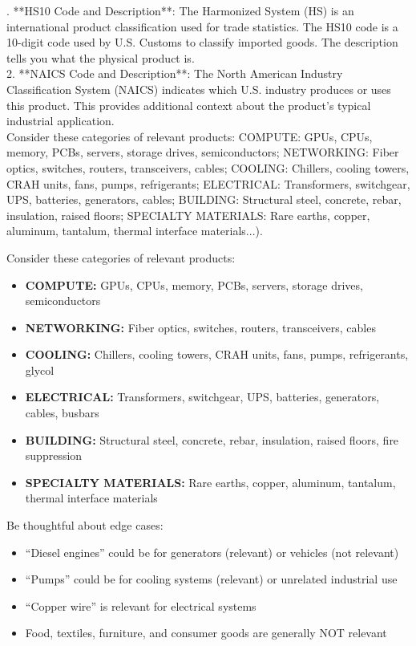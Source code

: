 \documentclass[12pt,pdftex]{article}
\newenvironment{prompt}{\par\medskip\noindent}{\par\medskip}
\begin{document}
\begin{onehalfspacing}
\begin{prompt}
1. **HS10 Code and Description**: The Harmonized System (HS) is an international product classification used for trade statistics. The HS10 code is a 10-digit code used by U.S. Customs to classify imported goods. The description tells you what the physical product is.\\

2. **NAICS Code and Description**: The North American Industry Classification System (NAICS) indicates which U.S. industry produces or uses this product. This provides additional context about the product's typical industrial application.\\

Consider these categories of relevant products: COMPUTE: GPUs, CPUs, memory, PCBs, servers, storage drives, semiconductors; NETWORKING: Fiber optics, switches, routers, transceivers, cables; COOLING: Chillers, cooling towers, CRAH units, fans, pumps, refrigerants; ELECTRICAL: Transformers, switchgear, UPS, batteries, generators, cables; BUILDING: Structural steel, concrete, rebar, insulation, raised floors; SPECIALTY MATERIALS: Rare earths, copper, aluminum, tantalum, thermal interface materials...).

\medskip

Consider these categories of relevant products:

\begin{itemize}
    \item \textbf{COMPUTE:} GPUs, CPUs, memory, PCBs, servers, storage drives, semiconductors
    \item \textbf{NETWORKING:} Fiber optics, switches, routers, transceivers, cables
    \item \textbf{COOLING:} Chillers, cooling towers, CRAH units, fans, pumps, refrigerants, glycol
    \item \textbf{ELECTRICAL:} Transformers, switchgear, UPS, batteries, generators, cables, busbars
    \item \textbf{BUILDING:} Structural steel, concrete, rebar, insulation, raised floors, fire suppression
    \item \textbf{SPECIALTY MATERIALS:} Rare earths, copper, aluminum, tantalum, thermal interface materials
\end{itemize}

\medskip

Be thoughtful about edge cases:
\begin{itemize}
    \item ``Diesel engines'' could be for generators (relevant) or vehicles (not relevant)
    \item ``Pumps'' could be for cooling systems (relevant) or unrelated industrial use
    \item ``Copper wire'' is relevant for electrical systems
    \item Food, textiles, furniture, and consumer goods are generally NOT relevant
\end{itemize}


\end{prompt}
\end{onehalfspacing}
\end{document}
